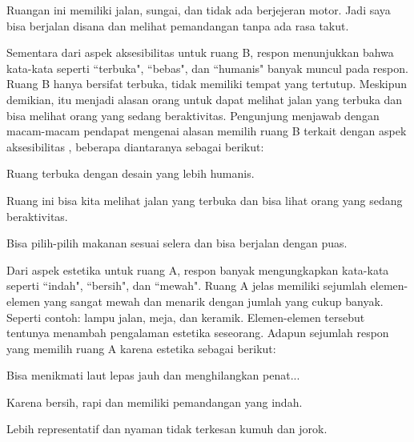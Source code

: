 \documentclass[11pt]{udthesis} %
\begin{document}
\begin{quoting}
    Ruangan ini memiliki jalan, sungai, dan tidak ada berjejeran motor. Jadi saya bisa berjalan disana dan melihat pemandangan tanpa ada rasa takut.
\end{quoting}

Sementara dari aspek aksesibilitas untuk ruang B, respon menunjukkan bahwa kata-kata seperti ``terbuka", ``bebas", dan ``humanis" banyak muncul pada respon. Ruang B hanya bersifat terbuka, tidak memiliki tempat yang tertutup. Meskipun demikian, itu menjadi alasan orang untuk dapat melihat jalan yang terbuka dan bisa melihat orang yang sedang beraktivitas. Pengunjung menjawab dengan macam-macam pendapat mengenai alasan memilih ruang B terkait dengan aspek aksesibilitas , beberapa diantaranya sebagai berikut:

\begin{quoting}
    Ruang terbuka dengan desain yang lebih humanis.
\end{quoting}

\begin{quoting}
    Ruang ini bisa kita melihat jalan yang terbuka dan bisa lihat orang yang sedang beraktivitas.
\end{quoting}

\begin{quoting}
    Bisa pilih-pilih makanan sesuai selera dan bisa berjalan dengan puas.
\end{quoting}

Dari aspek estetika untuk ruang A, respon banyak mengungkapkan kata-kata seperti ``indah", ``bersih", dan ``mewah". Ruang A jelas memiliki sejumlah elemen-elemen yang sangat mewah dan menarik dengan jumlah yang cukup banyak. Seperti contoh: lampu jalan, meja, dan keramik. Elemen-elemen tersebut tentunya menambah pengalaman estetika seseorang. Adapun sejumlah respon yang memilih ruang A karena estetika sebagai berikut:

\begin{quoting}
   Bisa menikmati laut lepas jauh dan menghilangkan penat...
\end{quoting}

\begin{quoting}
    Karena bersih, rapi dan memiliki pemandangan yang indah.
\end{quoting}

\begin{quoting}
    Lebih representatif dan nyaman tidak terkesan kumuh dan jorok.
\end{quoting}
\end{document}
